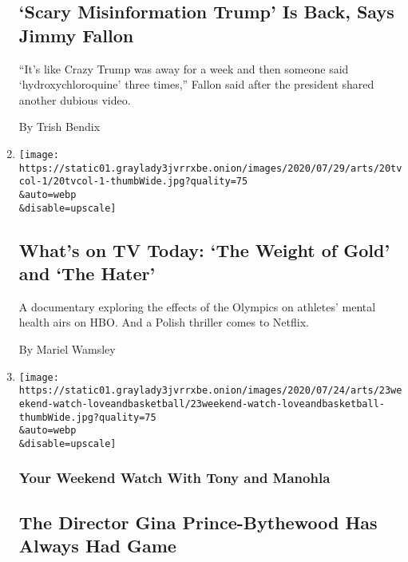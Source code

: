 \begin{enumerate}
  \hypertarget{scary-misinformation-trump-is-back-says-jimmy-fallon}{%
  \subsection{`Scary Misinformation Trump' Is Back, Says Jimmy
  Fallon}\label{scary-misinformation-trump-is-back-says-jimmy-fallon}}

  ``It's like Crazy Trump was away for a week and then someone said
  `hydroxychloroquine' three times,'' Fallon said after the president
  shared another dubious video.

  By Trish Bendix
\item
  \href{/2020/07/29/arts/television/whats-on-tv-today-the-weight-of-gold-and-the-hater.html}{}

  \texttt{[image: https://static01.graylady3jvrrxbe.onion/images/2020/07/29/arts/20tvcol-1/20tvcol-1-thumbWide.jpg?quality=75\\\&auto=webp\\\&disable=upscale]}

  \hypertarget{whats-on-tv-today-the-weight-of-gold-and-the-hater}{%
  \subsection{What's on TV Today: `The Weight of Gold' and `The
  Hater'}\label{whats-on-tv-today-the-weight-of-gold-and-the-hater}}

  A documentary exploring the effects of the Olympics on athletes'
  mental health airs on HBO. And a Polish thriller comes to Netflix.

  By Mariel Wamsley
\item
  \href{/2020/07/28/movies/love-basketball-viewing-party.html}{}

  \texttt{[image: https://static01.graylady3jvrrxbe.onion/images/2020/07/24/arts/23weekend-watch-loveandbasketball/23weekend-watch-loveandbasketball-thumbWide.jpg?quality=75\\\&auto=webp\\\&disable=upscale]}

  \hypertarget{your-weekend-watch-with-tony-and-manohla}{%
  \subsubsection{Your Weekend Watch With Tony and
  Manohla}\label{your-weekend-watch-with-tony-and-manohla}}

  \hypertarget{the-director-gina-prince-bythewood-has-always-had-game}{%
  \subsection{The Director Gina Prince-Bythewood Has Always Had
  Game}\label{the-director-gina-prince-bythewood-has-always-had-game}}


\end{enumerate}
